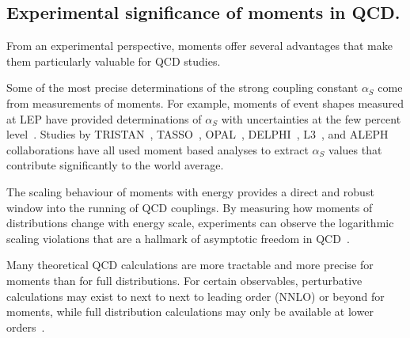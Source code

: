     \subsection{Experimental significance of moments in QCD.}
    
        From an experimental perspective, moments offer several advantages that make them particularly valuable for QCD studies.
        
        Some of the most precise determinations of the strong coupling constant $\alpha_S$ come from measurements of moments.
        For example, moments of event shapes measured at LEP have provided determinations of $\alpha_S$ with uncertainties at the few percent level~\cite{Abbiendi2004Measurementalpha_s, Dasgupta2004EventScattering}.
        Studies by TRISTAN~\cite{Ohnishi1993MeasurementsTRISTAN, Kato1989Double-cascadeAnnihilation}, TASSO~\cite{Althoff1984DeterminationHadrons, Hoyer1979QuantumE+e-, Adeva1983Model-independents}, OPAL~\cite{2005Measurementensuremathalpha_mathrms,Alexander1996QCDGeV, Ackerstaff1997QCDGeV}, DELPHI~\cite{TheDELPHICollaboration2004TheEnergies, SkachkovJinr1994OnCollaborations}, L3~\cite{Achard2002Determination192s208GeV, Heister2004StudiesGeV, Adeva1990TheExperiment, Acciarri1997StudyGeV, Acciarri1996StudyGeV, Acciarri1997QCDCollaboration, Bohm2001MeasurementLeptons, Acciarri2000QCDGeV, Achard2002DeterminationGeV, Achard2002Determination192s208GeV}, and ALEPH~\cite{BuskulicTheCollaboration, Buskulic1997StudiesGeV, Decamp1992MeasurementPredictions} collaborations have all used moment based analyses to extract $\alpha_S$ values that contribute significantly to the world average.

        The scaling behaviour of moments with energy provides a direct and robust window into the running of QCD couplings.
        By measuring how moments of distributions change with energy scale, experiments can observe the logarithmic scaling violations that are a hallmark of asymptotic freedom in QCD~\cite{Gross:1973id, Deur2016TheCoupling, Abe1990DeterminationApproximation, Farhi1977QuantumJets}.

        Many theoretical QCD calculations are more tractable and more precise for moments than for full distributions.
        For certain observables, perturbative calculations may exist to next to next to leading order (NNLO) or beyond for moments, while full distribution calculations may only be available at lower orders~\cite{Catani:1992ua, gehrmannResummationJetRates2017, Ridder2009NNLOAnnihilation, Chandramohan1981ConsequencesAnnihilation, Catani1991ThrustAnnihilation, Catani1991HeavyAnnihilation}.
        
